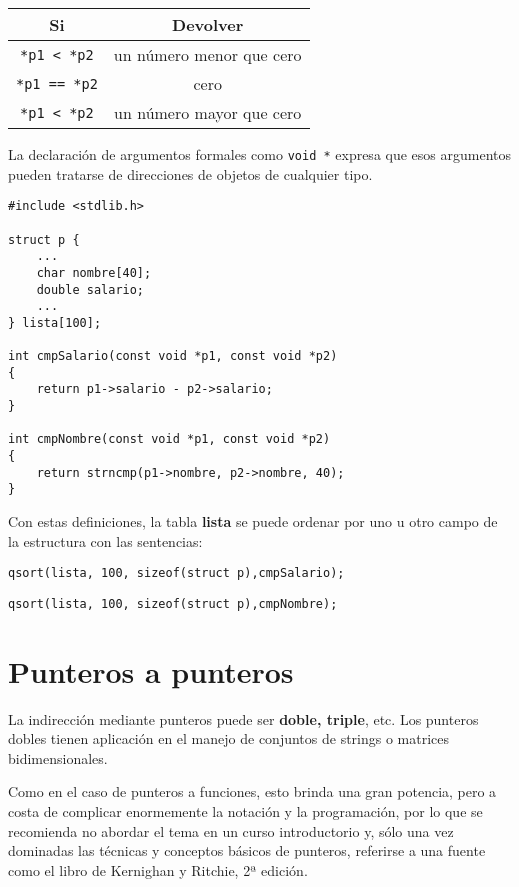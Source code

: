 \medskip
\medskip
\begin{tabular}{c|c}
Si & Devolver \\
\hline
\lstinline$*p1 < *p2$ & un número menor que cero\\
\hline
\lstinline$*p1 == *p2$ & cero\\
\hline
\lstinline$*p1 < *p2$ & un número mayor que cero\\
\end{tabular}
\medskip
\medskip


\begin{ejemplo}
La declaración de argumentos formales como \lstinline{void *} expresa que esos argumentos pueden tratarse de
direcciones de objetos de cualquier tipo.
\begin{lstlisting}
#include <stdlib.h>

struct p {
    ...
    char nombre[40];
    double salario;
    ...
} lista[100];

int cmpSalario(const void *p1, const void *p2)
{
    return p1->salario - p2->salario;
}

int cmpNombre(const void *p1, const void *p2)
{
    return strncmp(p1->nombre, p2->nombre, 40);
}
\end{lstlisting}

Con estas definiciones, la tabla \textbf{lista} se puede ordenar por uno u otro campo de
la estructura con las sentencias:
\begin{lstlisting}
qsort(lista, 100, sizeof(struct p),cmpSalario);
\end{lstlisting}
\begin{lstlisting}
qsort(lista, 100, sizeof(struct p),cmpNombre);
\end{lstlisting}
\end{ejemplo}


\section{Punteros a punteros}
La indirección mediante punteros puede ser \textbf{doble, triple}, etc. Los punteros
dobles tienen aplicación en el manejo de conjuntos de strings o matrices
bidimensionales. 

Como en el caso de punteros a funciones, esto brinda una gran
potencia, pero a costa de complicar enormemente la notación y la programación,
por lo que se recomienda no abordar el tema en un curso introductorio y, sólo
una vez dominadas las técnicas y conceptos básicos de punteros, referirse a una
fuente como el libro de Kernighan y Ritchie, 2ª edición.

